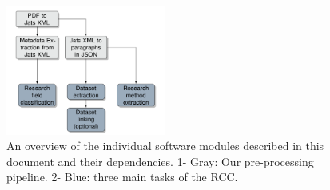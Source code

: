 


\begin{figure}[t]
    \includegraphics[width=0.47\textwidth]{figures/information-flow.png}
    \caption{An overview of the individual software modules described in this document and their dependencies. 1- Gray: Our pre-processing pipeline. 2- Blue: three main tasks of the RCC.}
    \label{figure:pipeline}
\end{figure}

